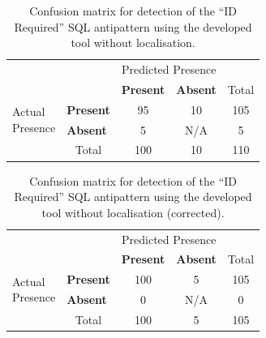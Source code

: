 \begin{table}[H]
    \centering
    \caption{Confusion matrix for detection of the “ID Required” SQL antipattern using the developed tool without localisation.}
    \begin{tabular}{l|l|c|c|c}
        \multicolumn{2}{c}{}&\multicolumn{2}{c}{Predicted Presence}&\\
        \cline{3-4}
        \multicolumn{2}{c|}{}&\textbf{Present}&\textbf{Absent}&\multicolumn{1}{c}{Total}\\
        \cline{2-4}
        \multirow{2}{1.5cm}{Actual\\Presence}& \textbf{Present} & 95 & 10 & 105\\
        \cline{2-4}
        & \textbf{Absent} & 5 & N/A & 5\\
        \cline{2-4}
        \multicolumn{1}{c}{} & \multicolumn{1}{c}{Total} & \multicolumn{1}{c}{100} & \multicolumn{1}{c}{10} & \multicolumn{1}{c}{110}\\
    \end{tabular}
\end{table}

\begin{table}[H]
    \centering
    \caption{Confusion matrix for detection of the “ID Required” SQL antipattern using the developed tool without localisation (corrected).}
    \begin{tabular}{l|l|c|c|c}
        \multicolumn{2}{c}{}&\multicolumn{2}{c}{Predicted Presence}&\\
        \cline{3-4}
        \multicolumn{2}{c|}{}&\textbf{Present}&\textbf{Absent}&\multicolumn{1}{c}{Total}\\
        \cline{2-4}
        \multirow{2}{1.5cm}{Actual\\Presence}& \textbf{Present} & 100 & 5 & 105\\
        \cline{2-4}
        & \textbf{Absent} & 0 & N/A & 0\\
        \cline{2-4}
        \multicolumn{1}{c}{} & \multicolumn{1}{c}{Total} & \multicolumn{1}{c}{100} & \multicolumn{1}{c}{5} & \multicolumn{1}{c}{105}\\
    \end{tabular}
\end{table}

